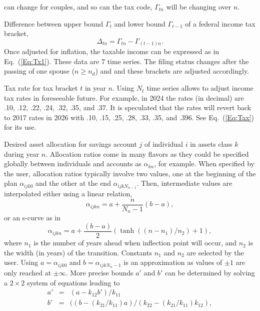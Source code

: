 \documentclass{report}[fleqn,12pt]
\begin{document}
\begin{description}[leftmargin=4em,style=multiline]
		can change for couples, and so can the tax code, $\Gamma_{tn}$ will be changing over $n$.
\item [$\Delta_{tn}$]
	Difference between upper bound $\Gamma_t$ and lower bound $\Gamma_{t-1}$
	of a federal income tax bracket,
	\begin{equation}
		\Delta_{tn} = \Gamma_{tn} - \Gamma_{(t-1)n}.
	\end{equation}
	Once adjusted for inflation,
	the taxable income can be expressed as in Eq.~(\ref{Eq:Tx1}). These data are 7 time series.
	The filing status changes after the passing of one spouse ($n \ge n_d$) and and these
	brackets are adjusted accordingly.
\item [$\theta_{tn}$]
	Tax rate for tax bracket $t$ in year $n$. Using $N_t$ time series allows to adjust income
	tax rates in foreseeable future.
	For example, in 2024 the rates (in decimal) are .10, .12, .22, .24, .32, .35, and .37.
	It is speculated that the rates will revert back to 2017 rates in 2026 with
	.10, .15, .25, .28, .33, .35, and .396. See Eq.~(\ref{Eq:Tax}) for its use.
\item [$\alpha_{ijkn}$]
	Desired asset allocation for savings account $j$ of individual $i$ in
	assets class $k$ during year $n$.
	Allocation ratios come in many flavors as they could be specified globally between
	individuals and accounts as $\alpha_{kn}$, for example.
	When specified by the user, allocation ratios typically involve two values, one at the
	beginning of the plan $\alpha_{ijk0}$ and the other at the end
	$\alpha_{ijkN_{n-1}}$. Then, intermediate values are interpolated either using
	a linear relation,
\begin{equation}
	\alpha_{ijkn} = a + \frac{n}{N_n - 1} (b - a),
\end{equation}
or an s-curve as in
\begin{equation}
	\alpha_{ijkn} = a + \frac{(b - a)}{2}
	(\tanh((n-n_1)/n_2) + 1),
\end{equation}
	where $n_1$ is the number of years ahead when inflection point will occur, and $n_2$ is the
	width (in years) of the transition. Constants $n_1$ and $n_2$ are selected by the user.
	Using $a = \alpha_{ijk0}$ and $b = \alpha_{ijkN_n-1}$ is an approximation as values of $\pm 1$
	are only reached at $\pm \infty$.
	More precise bounds $a'$ and $b'$ can be determined by solving a $2\times 2$ system
	of equations leading to
	\begin{eqnarray}
		a' &=& (a - k_{12}b')/k_{11} \nonumber \\
		b' &=& ((b - (k_{21}/k_{11})a)/(k_{22} - (k_{21}/k_{11})k_{12}),

\end{eqnarray}
\end{description}
\end{document}

